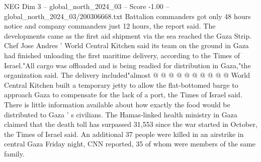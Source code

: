\begin{textsample}{NEG Dim 3 – global\_north\_2024\_03 – Score -1.00 – global\_north\_2024\_03/200306668.txt}
Battalion commanders got only 48 hours notice and company commanders just 12 hours, the report said.
The developments came as the first aid shipment via the sea reached the Gaza Strip.
Chef Jose Andres ' World Central Kitchen said its team on the ground in Gaza had finished unloading the first maritime delivery, according to the Times of Israel."All cargo was offloaded and is being readied for distribution in Gaza,"the organization said.
The delivery included"almost @ @ @ @ @ @ @ @ @ @ World Central Kitchen built a temporary jetty to allow the flat-bottomed barge to approach Gaza to compensate for the lack of a port, the Times of Israel said.
There is little information available about how exactly the food would be distributed to Gaza ' s civilians.
The Hamas-linked health ministry in Gaza claimed that the death toll has surpassed 31,553 since the war started in October, the Times of Israel said.
An additional 37 people were killed in an airstrike in central Gaza Friday night, CNN reported, 35 of whom were members of the same family.

\end{textsample}
